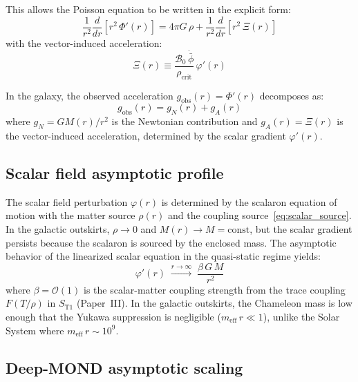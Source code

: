 \documentclass[aps,prd,twocolumn,superscriptaddress,nofootinbib]{revtex4-2}
\begin{document}
This allows the Poisson equation to be written in the explicit form:
\begin{equation}
\frac{1}{r^2}\frac{d}{dr}\!\left[r^2\,\Phi'(r)\right] = 4\pi G\,\rho + \frac{1}{r^2}\frac{d}{dr}\!\left[r^2\,\Xi(r)\right]
\label{eq:poisson_Xi}
\end{equation}
with the vector-induced acceleration:
\begin{equation}
\Xi(r) \equiv \frac{\mathcal{B}_0\,\dot{\bar{\phi}}}{\rho_{\mathrm{crit}}}\,\varphi'(r)
\label{eq:Xi_def}
\end{equation}

In the galaxy, the observed acceleration $g_{\mathrm{obs}}(r) = \Phi'(r)$ decomposes as:
\begin{equation}
g_{\mathrm{obs}}(r) = g_N(r) + g_A(r)
\label{eq:g_obs}
\end{equation}
where $g_N = GM(r)/r^2$ is the Newtonian contribution and $g_A(r) = \Xi(r)$ is the vector-induced acceleration, determined by the scalar gradient $\varphi'(r)$.

\subsection{Scalar field asymptotic profile}
\label{sec:scalar_asymptotic}

The scalar field perturbation $\varphi(r)$ is determined by the scalaron equation of motion with the matter source $\rho(r)$ and the coupling source~\eqref{eq:scalar_source}. In the galactic outskirts, $\rho \to 0$ and $M(r) \to M = \mathrm{const}$, but the scalar gradient persists because the scalaron is sourced by the enclosed mass. The asymptotic behavior of the linearized scalar equation in the quasi-static regime yields:
\begin{equation}
\varphi'(r) \;\xrightarrow{r \to \infty}\; \frac{\beta\,G\,M}{r^2}
\label{eq:phi_asymptotic}
\end{equation}
where $\beta = \mathcal{O}(1)$ is the scalar-matter coupling strength from the trace coupling $F(T/\rho)$ in $S_{\mathrm{T1}}$ (Paper~III). In the galactic outskirts, the Chameleon mass is low enough that the Yukawa suppression is negligible ($m_{\mathrm{eff}}\,r \ll 1$), unlike the Solar System where $m_{\mathrm{eff}}\,r \sim 10^{9}$.

\subsection{Deep-MOND asymptotic scaling}
\label{sec:deep_mond}
\end{document}
